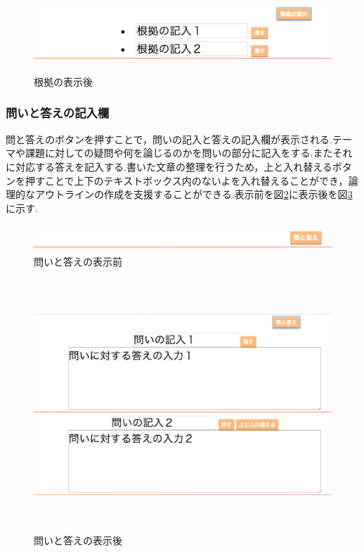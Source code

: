\documentclass[a4j,12pt]{jarticle}
\begin{document}
\begin{figure}[h]
\begin{center}
 \includegraphics[clip,width=150mm,height=30mm]{figure/03konkuo.png}
\end{center}
 \caption{根拠の表示後}
 \label{fig:k}
\end{figure}

\newpage
\subsubsection{問いと答えの記入欄}
問と答えのボタンを押すことで，問いの記入と答えの記入欄が表示される.テーマや課題に対しての疑問や何を論じるのかを問いの部分に記入をする.またそれに対応する答えを記入する.書いた文章の整理を行うため，上と入れ替えるボタンを押すことで上下のテキストボックス内のないよを入れ替えることができ，論理的なアウトラインの作成を支援することができる.表示前を図\ref{fig:l}に表示後を図\ref{fig:m}に示す.

\begin{figure}[h]
\begin{center}
 \includegraphics[clip,width=150mm,height=10mm]{figure/04qanda.png}
\end{center}
 \caption{問いと答えの表示前}
 \label{fig:l}
\end{figure}

\begin{figure}[h]
\begin{center}
 \includegraphics[clip,width=150mm,height=95mm]{figure/05qanda.png}
\end{center}
 \caption{問いと答えの表示後}
 \label{fig:m}
\end{figure}
\newpage
\end{document}
